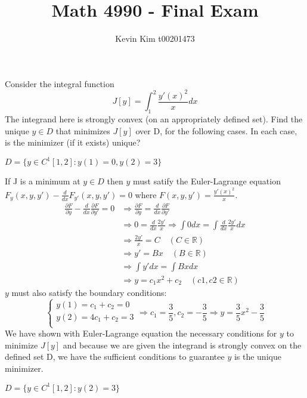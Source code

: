\documentclass[12pt]{article}
\newcommand{\R}{\mathbb{R}}
\newcommand{\lra}{\Longrightarrow}
\newenvironment{problem}[2][Problem]{\begin{trivlist}
  \item[\hskip \labelsep {\bfseries #1}\hskip \labelsep {\bfseries #2:}]}{\end{trivlist}}
\newenvironment{subproblem}[2][Part]{\begin{trivlist}
  \item[\hskip \labelsep {\bfseries #1}\hskip \labelsep {\bfseries (#2)}]}{\end{trivlist}}
\newenvironment{solution}[1][Solution]{\begin{trivlist}
  \item[\hskip \labelsep {\bfseries #1} \hskip \labelsep]}{\end{trivlist}}
\theoremstyle{remark}
\begin{document}
\title{Math 4990 - Final Exam}
\author{Kevin Kim t00201473}
\maketitle

\begin{problem}{1}
  Consider the integral function
  \[
    J[y] = \int_{1}^{2}\frac{y'(x)^2}{x}dx
  \]
  The integrand here is strongly convex (on an appropriately defined set).
  Find the unique \(y \in D\) that minimizes \(J[y]\) over D, for the following cases.
  In each case, is the minimizer (if it exists) unique?
\end{problem}

\begin{subproblem}{a}
  \(D=\{y \in C^1[1,2]:y(1) = 0, y(2) = 3\}\)
\end{subproblem}

\begin{solution}
  $ $\\
  If J is a minimum at \(y \in D \) then \(y\) must satify the Euler-Lagrange equation
  \\\(F_y(x,y,y') - \frac{d}{dx}F_{y'}(x,y,y') = 0\) where \(F(x,y,y') = \frac{y'(x)^2}{x}\).
  \begin{align*}
    \frac{\partial F}{\partial y} - \frac{d}{dx}\frac{\partial F}{\partial y'} = 0
    &\lra \frac{\partial F}{\partial y} = \frac{d}{dx}\frac{\partial F}{\partial y'} \\
    &\lra 0 = \frac{d}{dx}\frac{2y'}{x} \lra \int 0 dx = \int \frac{d}{dx}\frac{2y'}{x} dx \\
    &\lra \frac{2y'}{x} = C \quad (C \in \R) \\
    &\lra y' = Bx \quad (B \in \R) \\
    &\lra \int y' dx = \int Bx dx \\
    &\lra y = c_1x^2 + c_2 \quad (c1,c2 \in \R)
  \end{align*}
  \(y\) must also satisfy the boundary conditions:
  \[
    \left\{
      \begin{array}{ll}
        y(1) = c_1 + c_2 = 0\\
        y(2) = 4c_1 + c_2 = 3\\
      \end{array}
    \right.
    \lra c_1 = \frac{3}{5}, c_2 = -\frac{3}{5} \lra \boxed{y = \frac{3}{5}x^2 - \frac{3}{5}}
  \]
  We have shown with Euler-Lagrange equation the necessary conditions for \(y\) to minimize \(J[y]\)
  and because we are given the integrand is strongly convex on the defined set D, we have
  the sufficient conditions to guarantee \(y\) is the unique minimizer.
\end{solution}
\clearpage
\begin{subproblem}{b}
  \(D = \{y \in C^1[1,2]:y(2) = 3\}\)
\end{subproblem}
\end{document}

